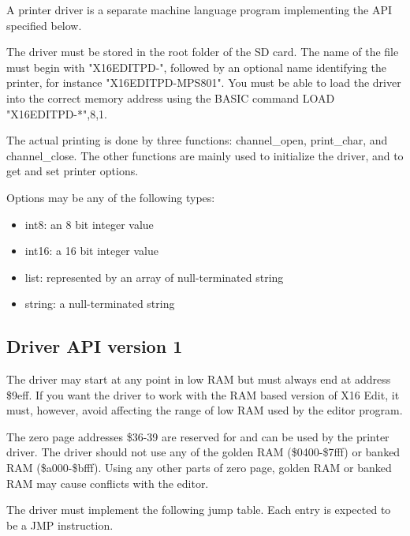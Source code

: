 \documentclass{article}
\begin{document}
        A printer driver is a separate machine language program implementing the API
        specified below.

        The driver must be stored in the root folder of the SD card. The name of the file
        must begin with "X16EDITPD-", followed by an optional name identifying the printer,
        for instance "X16EDITPD-MPS801". You must be able to load the driver into the
        correct memory address using the BASIC command LOAD "X16EDITPD-*",8,1.

        The actual printing is done by three functions: channel\_open, print\_char, and
        channel\_close. The other functions are mainly used to initialize the driver, and to
        get and set printer options.

        Options may be any of the following types:

        \begin{itemize}
            \item int8: an 8 bit integer value
            \item int16: a 16 bit integer value
            \item list: represented by an array of null-terminated string
            \item string: a null-terminated string
        \end{itemize}

    \subsection{Driver API version 1}

        The driver may start at any point in low RAM but must always end at address \$9eff.
        If you want the driver to work with the RAM based version of X16 Edit, it must, however, 
        avoid affecting the range of low RAM used by the editor program.

        The zero page addresses \$36-39 are reserved for and can be used by the printer driver.
        The driver should not use any of the golden RAM (\$0400-\$7fff) or banked
        RAM (\$a000-\$bfff). Using any other parts of zero page, golden RAM or
        banked RAM may cause conflicts with the editor. 
        
        The driver must implement the following jump table. Each entry is expected to be a JMP instruction.
\end{document}
